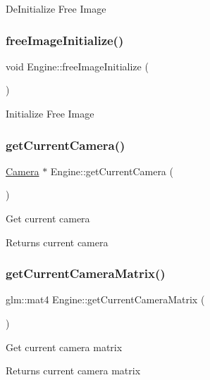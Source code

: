 De\+Initialize Free Image \mbox{\label{classEngine_abeafe4eb10b3068b3623b2ca905e1fb5}} 
\subsubsection{\texorpdfstring{free\+Image\+Initialize()}{freeImageInitialize()}}
{\footnotesize\ttfamily void Engine\+::free\+Image\+Initialize (\begin{DoxyParamCaption}{ }\end{DoxyParamCaption})}

Initialize Free Image \mbox{\label{classEngine_a28b61944fbc25c2a640c400c0827552e}} 
\subsubsection{\texorpdfstring{get\+Current\+Camera()}{getCurrentCamera()}}
{\footnotesize\ttfamily \hyperlink{classCamera}{Camera} $\ast$ Engine\+::get\+Current\+Camera (\begin{DoxyParamCaption}{ }\end{DoxyParamCaption})}

Get current camera \begin{DoxyReturn}{Returns}
current camera 
\end{DoxyReturn}
\mbox{\label{classEngine_a7f476ef9fb9bf0f578e4d6490fd0553a}} 
\subsubsection{\texorpdfstring{get\+Current\+Camera\+Matrix()}{getCurrentCameraMatrix()}}
{\footnotesize\ttfamily glm\+::mat4 Engine\+::get\+Current\+Camera\+Matrix (\begin{DoxyParamCaption}{ }\end{DoxyParamCaption})}

Get current camera matrix \begin{DoxyReturn}{Returns}
current camera matrix 
\end{DoxyReturn}
\mbox{\label{classEngine_aa2fe1c0ae8e569098ce93ec4b173fcbe}} 
